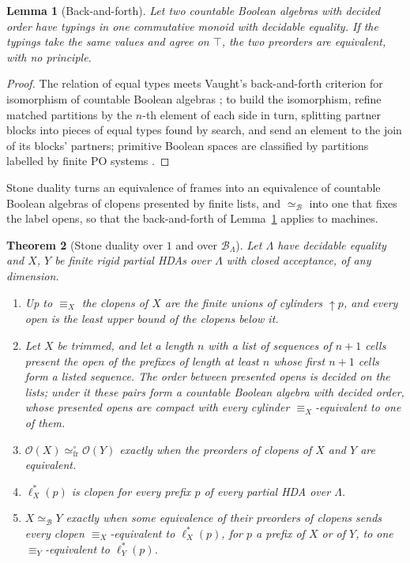 \documentclass{lmcs}
\newtheorem{theorem}{Theorem}[section]
\newtheorem{lemma}[theorem]{Lemma}
\theoremstyle{definition}
\theoremstyle{remark}
\newcommand{\Op}{\mathcal{O}}
\newcommand{\feq}[1]{\equiv_{#1}}
\newcommand{\upc}[1]{{\uparrow}#1}
\newcommand{\eqFrF}{\simeq^{\circ}_{\mathrm{fr}}}
\providecommand{\BL}{\mathcal{B}_{\Lambda}}
\providecommand{\eqB}{\simeq_{\mathcal{B}}}
\providecommand{\lst}[1]{\ell^{*}_{#1}}
\begin{document}
\begin{lemma}[Back-and-forth]\label{thm:dec-backforth}
Let two countable Boolean algebras with decided order have typings in one commutative monoid with decidable
equality. If the typings take the same values and agree on $\top$, the two preorders are equivalent, with no
principle.
\end{lemma}

\begin{proof}
The relation of equal types meets Vaught's back-and-forth criterion for isomorphism of countable Boolean algebras
\cite{Vaught54};
to build the isomorphism, refine matched partitions by the $n$-th element of each side in turn, splitting partner blocks into pieces of equal
types found by search, and send an element to the join of its blocks' partners; primitive Boolean spaces are
classified by partitions labelled by finite PO systems
\cite{Apps23}.
\end{proof}

Stone duality turns an equivalence of frames into an equivalence of countable Boolean algebras of clopens presented
by finite lists, and $\eqB$ into one that fixes the label opens, so that the back-and-forth of
Lemma~\ref{thm:dec-backforth} applies to machines.

\begin{theorem}[Stone duality over $1$ and over $\BL$]\label{prop:dec-clopen}\label{thm:dec-stone}
Let $\Lambda$ have decidable equality and $X$, $Y$ be finite rigid partial HDAs over $\Lambda$ with closed
acceptance, of any dimension.
\begin{enumerate}[nosep]
\item Up to $\feq{X}$ the clopens of $X$ are the finite unions of cylinders $\upc{p}$, and every open is the least upper
  bound of the clopens below it.
\item Let $X$ be trimmed, and let a length $n$ with a list of sequences of $n+1$ cells present the open of the prefixes
  of length at least $n$ whose first $n+1$ cells form a listed sequence. The order between presented opens is decided
  on the lists; under it these pairs form a countable Boolean algebra with decided
  order, whose presented opens are compact with every cylinder $\feq{X}$-equivalent to one of
  them.
\item $\Op(X)\eqFrF\Op(Y)$ exactly when the preorders of clopens of $X$ and $Y$ are equivalent.
\item $\lst{X}(p)$ is clopen for every prefix $p$ of every partial HDA over $\Lambda$.
\item $X\eqB Y$ exactly when some equivalence of their preorders of clopens sends every clopen
  $\feq{X}$-equivalent to $\lst{X}(p)$, for $p$ a prefix of $X$ or of $Y$, to one $\feq{Y}$-equivalent to
  $\lst{Y}(p)$.
\end{enumerate}
\end{theorem}
\end{document}
